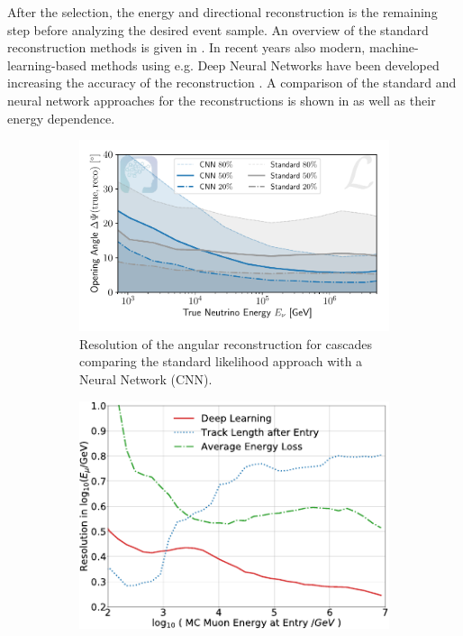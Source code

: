 After the selection, the energy and directional reconstruction is the remaining step before analyzing the desired event sample.
An overview of the standard reconstruction methods is given in \cite{AMANDA2004Reco, IceCube2014Ereco}.
In recent years also modern, machine-learning-based methods using e.g. Deep Neural Networks have been developed increasing the accuracy of the reconstruction \cite{Huennefeld17ICRC, Huennefeld17Master, IceCube20DNN}.
A comparison of the standard and neural network approaches for the reconstructions is shown in  as well as their energy dependence.
\begin{figure}
    \centering
    \begin{subfigure}{0.55\textwidth}
        \centering
        \includegraphics[width=\textwidth]{./images/icecube_resolution_cascade_angular.pdf}
        \caption{Resolution of the angular reconstruction for cascades comparing the standard likelihood approach with a Neural Network (CNN). \cite{IceCube20DNN}}
        \label{fig:icecube_angular_resolution}
    \end{subfigure}
    \hfill
    \begin{subfigure}{0.43\textwidth}
        \centering
        \includegraphics[width=\textwidth]{./images/icecube_resolution_muon_energy.pdf}

\end{subfigure}
\end{figure}
